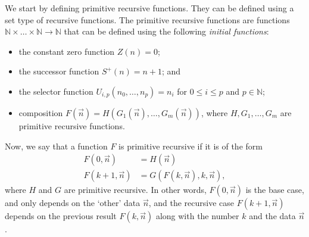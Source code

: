 \documentclass[a4paper, openany]{memoir}
\theoremstyle{definition}
\begin{document}
    We start by defining primitive recursive functions. They can be defined using a set type of recursive functions. The primitive recursive functions are functions $\mathbb{N} \times \dots \times \mathbb{N} \to \mathbb{N}$ that can be defined using the following \emph{initial functions}:
    \begin{itemize}
        \item the constant zero function $Z(n) = 0$;
        \item the successor function $S^+(n) = n+1$; and
        \item the selector function $U_{i, p}(n_0, \dots, n_p) = n_i$ for $0 \leq i \leq p$ and $p \in \mathbb{N}$;
        \item composition $F(\vec{n}) = H(G_1(\vec{n}), \dots, G_m(\vec{n}))$, where $H, G_1, \dots, G_m$ are primitive recursive functions.
    \end{itemize}
    Now, we say that a function $F$ is primitive recursive if it is of the form
    \begin{align*}
        F(0, \vec{n}) &= H(\vec{n}) \\
        F(k+1, \vec{n}) &= G(F(k, \vec{n}), k, \vec{n}),
    \end{align*}
    where $H$ and $G$ are primitive recursive. In other words, $F(0, \vec{n})$ is the base case, and only depends on the `other' data $\vec{n}$, and the recursive case $F(k+1, \vec{n})$ depends on the previous result $F(k, \vec{n})$ along with the number $k$ and the data $\vec{n}$.
\end{document}

